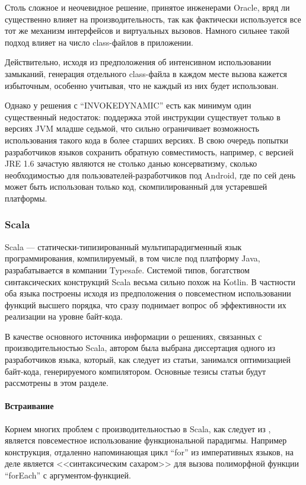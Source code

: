 Столь сложное и неочевидное решение, принятое инженерами Oracle, вряд ли существенно влияет на
производительность, так как фактически используется все тот же механизм интерфейсов и виртуальных
вызовов.
Намного сильнее такой подход влияет на число class-файлов в приложении.

Действительно, исходя из предположения об интенсивном использовании замыканий, генерация отдельного
class-файла в каждом месте вызова кажется избыточным, особенно учитывая, что не каждый из них
будет использован.

Однако у решения с ``INVOKEDYNAMIC'' есть как минимум один существенный недостаток: поддержка этой
инструкции существует только в версиях JVM младше седьмой, что сильно ограничивает возможность
использования такого кода в более старших версиях. В свою очередь попытки разработчиков языков
сохранить обратную совместимость, например, с версией JRE 1.6 зачастую являются не столько данью
консерватизму, сколько необходимостью для пользователей-разработчиков под Android, где по сей день
может быть использован только код, скомпилированный для устаревшей платформы.

\subsubsection{Scala}
\label{section:scala}
Scala --- статически-типизированный мультипарадигменный язык программирования, компилируемый,
в том числе под платформу Java, разрабатывается в компании Typesafe.
Системой типов, богатством синтаксических конструкций Scala весьма сильно похож на Kotlin.
В частности оба языка построены исходя из предположения о повсеместном использовании
функций высшего порядка, что сразу поднимает вопрос об эффективности их реализации на уровне
байт-кода.

В качестве основного источника информации о решениях, связанных с производительностью Scala,
автором была выбрана диссертация\cite{ScalaDragos} одного из разработчиков языка,
который, как следует из статьи, занимался оптимизацией байт-кода, генерируемого компилятором.
Основные тезисы статьи будут рассмотрены в этом разделе.

\paragraph{Встраивание}
Корнем многих проблем с производительностью в Scala, как следует из \cite{ScalaDragos}, является
повсеместное использование функциональной парадигмы.
Например конструкция, отдаленно напоминающая цикл ``for'' из императивных языков, на деле является
<<синтаксическим сахаром>> для вызова полиморфной функции ``forEach'' с аргументом-функцией.

